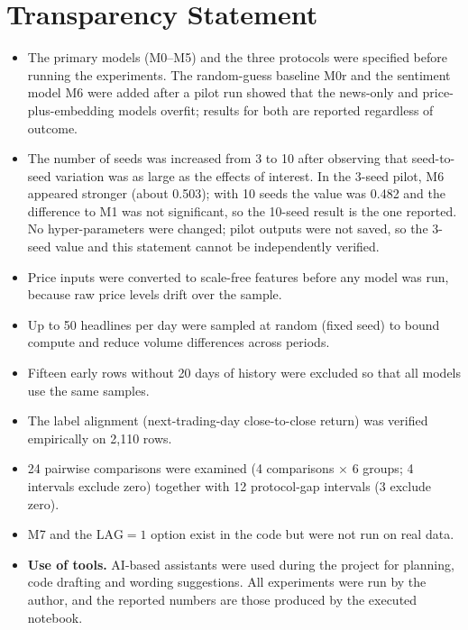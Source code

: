 \newpage
\appendix
\section{Transparency Statement}\label{app:transparency}
\begin{itemize}
\item The primary models (M0--M5) and the three protocols were specified before running the experiments. The random-guess baseline M0r and the sentiment model M6 were added after a pilot run showed that the news-only and price-plus-embedding models overfit; results for both are reported regardless of outcome.
\item The number of seeds was increased from 3 to 10 after observing that seed-to-seed variation was as large as the effects of interest. In the 3-seed pilot, M6 appeared stronger (about 0.503); with 10 seeds the value was 0.482 and the difference to M1 was not significant, so the 10-seed result is the one reported. No hyper-parameters were changed; pilot outputs were not saved, so the 3-seed value and this statement cannot be independently verified.
\item Price inputs were converted to scale-free features before any model was run, because raw price levels drift over the sample.
\item Up to 50 headlines per day were sampled at random (fixed seed) to bound compute and reduce volume differences across periods.
\item Fifteen early rows without 20 days of history were excluded so that all models use the same samples.
\item The label alignment (next-trading-day close-to-close return) was verified empirically on 2{,}110 rows.
\item 24 pairwise comparisons were examined (4 comparisons $\times$ 6 groups; 4 intervals exclude zero) together with 12 protocol-gap intervals (3 exclude zero).
\item M7 and the $\mathrm{LAG}=1$ option exist in the code but were not run on real data.
\item \textbf{Use of tools.} AI-based assistants were used during the project for planning, code drafting and wording suggestions. All experiments were run by the author, and the reported numbers are those produced by the executed notebook.
\end{itemize}

